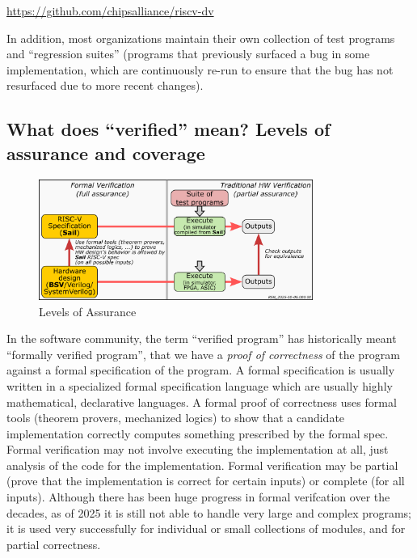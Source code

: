 \begin{tabbing}
\hmm \= \url{https://github.com/chipsalliance/riscv-dv}
\end{tabbing}

In addition, most organizations maintain their own collection of test
programs and ``regression suites'' (programs that previously surfaced
a bug in some implementation, which are continuously re-run to ensure
that the bug has not resurfaced due to more recent changes).


\subsection{What does ``verified'' mean? Levels of assurance and coverage}


\begin{figure}[htbp]
  \centerline{\includegraphics[width=0.8\textwidth,angle=0]{Figures/RSN_2025-10-06.000.00_Levels_of_Assurance}}
  \caption{\label{Fig_Levels_of_Assurance}
           Levels of Assurance}
\end{figure}

In the software community, the term ``verified program'' has
historically meant ``formally verified program'', {\ie} that we have a
\emph{proof of correctness} of the program against a formal
specification of the program.  A formal specification is usually
written in a specialized formal specification language which are
usually highly mathematical, declarative languages.  A formal proof of
correctness uses formal tools (theorem provers, mechanized logics) to
show that a candidate implementation correctly computes something
prescribed by the formal spec.  Formal verification may not involve
executing the implementation at all, just analysis of the code for the
implementation.  Formal verification may be partial (prove that the
implementation is correct for certain inputs) or complete (for all
inputs).  Although there has been huge progress in formal verifcation
over the decades, as of 2025 it is still not able to handle very large
and complex programs; it is used very successfully for individual or
small collections of modules, and for partial correctness.

